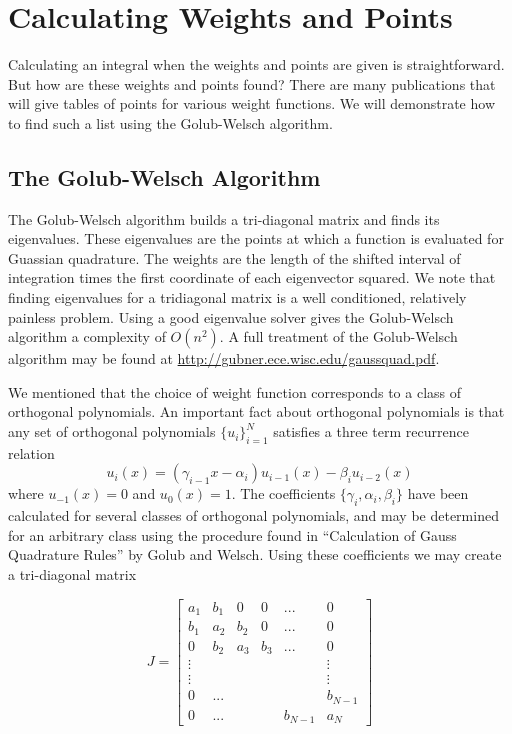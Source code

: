 \section*{Calculating Weights and Points} %

Calculating an integral when the weights and points are given is straightforward.
But how are these weights and points found?
There are many publications that will give tables of points for various weight functions.
We will demonstrate how to find such a list using the Golub-Welsch algorithm.

\subsection*{The Golub-Welsch Algorithm} %

The Golub-Welsch algorithm builds a tri-diagonal matrix and finds its eigenvalues.
These eigenvalues are the points at which a function is evaluated for Guassian quadrature.
The weights are the length of the shifted interval of integration times the first coordinate of each eigenvector squared.
We note that finding eigenvalues for a tridiagonal matrix is a well conditioned, relatively painless problem.
Using a good eigenvalue solver gives the Golub-Welsch algorithm a complexity of $O(n^2)$.
A full treatment of the Golub-Welsch algorithm may be found at \url{http://gubner.ece.wisc.edu/gaussquad.pdf}.

We mentioned that the choice of weight function corresponds to a class of orthogonal polynomials.
An important fact about orthogonal polynomials is that any set of orthogonal polynomials $\{u_i\}_{i=1}^{N}$ satisfies a three term recurrence relation
\[
u_{i}(x) = (\gamma_{i-1}x-\alpha_i)u_{i-1}(x) - \beta_iu_{i-2}(x)
\]
where $u_{-1}(x) = 0$ and $u_0(x) = 1$.
The coefficients $\{\gamma_i, \alpha_i, \beta_i\}$ have been calculated for several classes of orthogonal polynomials, and may be determined for an arbitrary class using the procedure found in ``Calculation of Gauss Quadrature Rules'' by Golub and Welsch.
Using these coefficients we may create a tri-diagonal matrix


\[ %
J = \begin{bmatrix}
a_1 & b_1 & 0 & 0 & ... & 0 \\
b_1 & a_2 & b_2 & 0 & ... & 0 \\
0 & b_2 & a_3 & b_3 & ... & 0 \\
\vdots & & & & & \vdots \\
\vdots & & & & & \vdots \\
0 & ... & & & & b_{N-1} \\
0 & ... & & & b_{N-1} & a_N
\end{bmatrix}
\]

